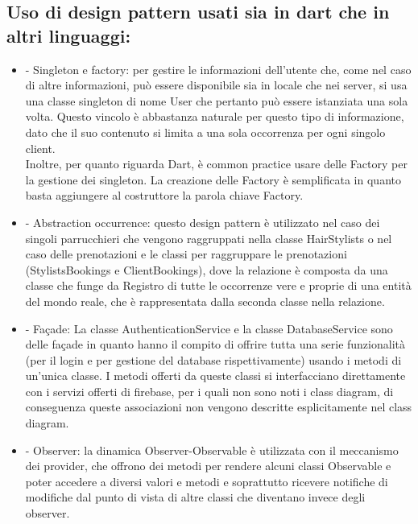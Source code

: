 \documentclass{article}
\begin{document}
\subsection{Uso di design pattern usati sia in dart che in altri linguaggi:}
\begin{itemize}
    \item -	Singleton e factory: per gestire le informazioni dell’utente che, come nel caso di altre informazioni, può essere disponibile sia in locale che nei server, si usa una classe singleton di nome User che pertanto può essere istanziata una sola volta. Questo vincolo è abbastanza naturale per questo tipo di informazione, dato che il suo contenuto si limita a una sola occorrenza per ogni singolo client. 
\\Inoltre, per quanto riguarda Dart, è common practice usare delle Factory per la gestione dei singleton. La creazione delle Factory è semplificata in quanto basta aggiungere al costruttore la parola chiave Factory. 

    \item -	Abstraction occurrence: questo design pattern è utilizzato nel caso dei singoli parrucchieri che vengono raggruppati nella classe HairStylists o nel caso delle prenotazioni e le classi per raggruppare le prenotazioni (StylistsBookings e ClientBookings), dove la relazione è composta da una classe che funge da Registro di tutte le occorrenze vere e proprie di una entità del mondo reale, che è rappresentata dalla seconda classe nella relazione.
    \item -	Façade: La classe AuthenticationService e la classe DatabaseService sono delle façade in quanto hanno il compito di offrire tutta una serie funzionalità (per il login e per gestione del database rispettivamente) usando i metodi di un'unica classe. I metodi offerti da queste classi si interfacciano direttamente con i servizi offerti di firebase, per i quali non sono noti i class diagram, di conseguenza queste associazioni non vengono descritte esplicitamente nel class diagram.
    \item -	Observer: la dinamica Observer-Observable è utilizzata con il meccanismo dei provider, che offrono dei metodi per rendere alcuni classi Observable e poter accedere a diversi valori e metodi e soprattutto ricevere notifiche di modifiche dal punto di vista di altre classi che diventano invece degli observer.   
\end{itemize} 
\end{document}
